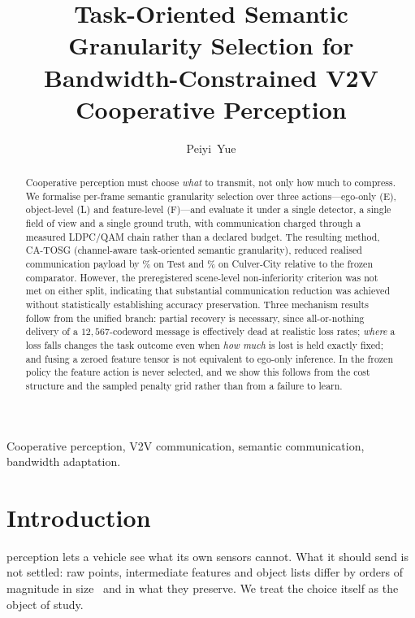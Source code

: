 \documentclass[journal]{IEEEtran}
\begin{document}
\title{Task-Oriented Semantic Granularity Selection for\\Bandwidth-Constrained V2V Cooperative Perception}
\author{Peiyi~Yue}
\maketitle

\begin{abstract}
Cooperative perception must choose \emph{what} to transmit, not only how much to compress. We
formalise per-frame semantic granularity selection over three actions---ego-only (E), object-level
(L) and feature-level (F)---and evaluate it under a single detector, a single field of view and a
single ground truth, with communication charged through a measured LDPC/QAM chain rather than a
declared budget. The resulting method, CA-TOSG (channel-aware task-oriented semantic
granularity), reduced realised communication payload by \TestSaving\% on Test and
\CulverSaving\% on Culver-City relative to the frozen comparator. However, the preregistered
scene-level non-inferiority criterion was not met on either split, indicating that substantial
communication reduction was achieved without statistically establishing accuracy preservation.
Three mechanism results follow from the unified branch: partial recovery is necessary, since
all-or-nothing delivery of a $12{,}567$-codeword message is effectively dead at realistic loss
rates; \emph{where} a loss falls changes the task outcome even when \emph{how much} is lost is held
exactly fixed; and fusing a zeroed feature tensor is not equivalent to ego-only inference. In the
frozen policy the feature action is never selected, and we show this follows from the cost structure
and the sampled penalty grid rather than from a failure to learn.
\end{abstract}

\begin{IEEEkeywords}
Cooperative perception, V2V communication, semantic communication, bandwidth adaptation.
\end{IEEEkeywords}

\section{Introduction}
 perception lets a vehicle see what its own sensors cannot. What it
should send is not settled: raw points, intermediate features and object lists differ by orders of
magnitude in size~\cite{hu2022where2comm,liu2020when2com} and in what they preserve. We treat the choice itself as the object of study.
\end{document}
